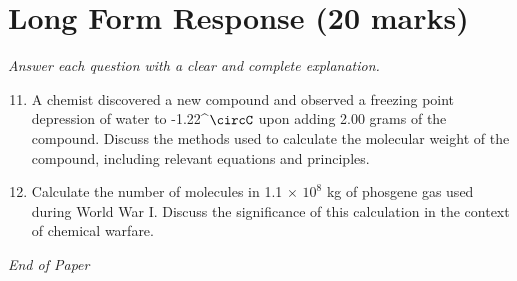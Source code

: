 \documentclass[12pt]{article}
\begin{document}
\section*{Long Form Response (20 marks)}
\textit{Answer each question with a clear and complete explanation.}
\begin{enumerate}[label=\arabic*.]
\setcounter{enumi}{10}
\item A chemist discovered a new compound and observed a freezing point depression of water to -1.22^\ensuremath{\circC} upon adding 2.00 grams of the compound. Discuss the methods used to calculate the molecular weight of the compound, including relevant equations and principles.
\item Calculate the number of molecules in 1.1 \ensuremath{\times} $10^8$ kg of phosgene gas used during World War I. Discuss the significance of this calculation in the context of chemical warfare.
\end{enumerate}

\vfill
\noindent\textit{End of Paper}
\end{document}
